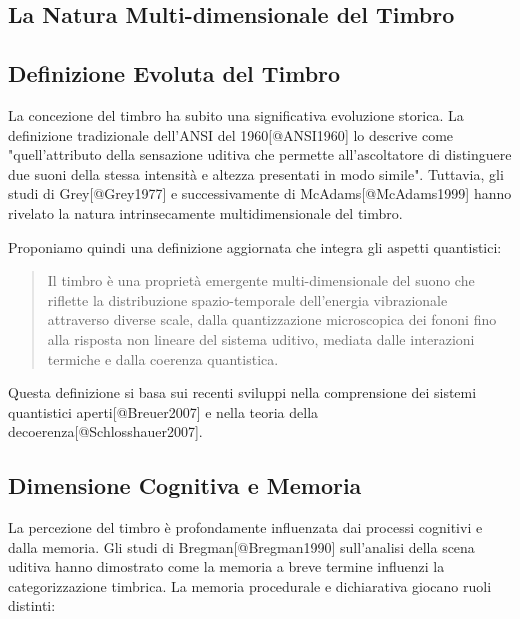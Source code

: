\documentclass[a4paper,11pt]{article}
\begin{document}
\subsection{La Natura Multi-dimensionale del Timbro}\hypertarget{la-natura-multi-dimensionale-del-timbro-1}{}\label{la-natura-multi-dimensionale-del-timbro-1}

\subsection{Definizione Evoluta del Timbro}\hypertarget{definizione-evoluta-del-timbro}{}\label{definizione-evoluta-del-timbro}

La concezione del timbro ha subito una significativa evoluzione storica.
La definizione tradizionale dell'ANSI del 1960{[}@ANSI1960{]} lo descrive
come "quell'attributo della sensazione uditiva che permette
all'ascoltatore di distinguere due suoni della stessa intensità e
altezza presentati in modo simile". Tuttavia, gli studi di
Grey{[}@Grey1977{]} e successivamente di McAdams{[}@McAdams1999{]} hanno
rivelato la natura intrinsecamente multidimensionale del timbro.

Proponiamo quindi una definizione aggiornata che integra gli aspetti
quantistici:

\begin{quote}
Il timbro è una proprietà emergente multi-dimensionale del suono che
riflette la distribuzione spazio-temporale dell'energia vibrazionale
attraverso diverse scale, dalla quantizzazione microscopica dei fononi
fino alla risposta non lineare del sistema uditivo, mediata dalle
interazioni termiche e dalla coerenza quantistica.
\end{quote}

Questa definizione si basa sui recenti sviluppi nella comprensione dei
sistemi quantistici aperti{[}@Breuer2007{]} e nella teoria della
decoerenza{[}@Schlosshauer2007{]}.

\subsection{Dimensione Cognitiva e Memoria}\hypertarget{dimensione-cognitiva-e-memoria}{}\label{dimensione-cognitiva-e-memoria}

La percezione del timbro è profondamente influenzata dai processi
cognitivi e dalla memoria. Gli studi di Bregman{[}@Bregman1990{]}
sull'analisi della scena uditiva hanno dimostrato come la memoria a
breve termine influenzi la categorizzazione timbrica. La memoria
procedurale e dichiarativa giocano ruoli distinti:
\end{document}
